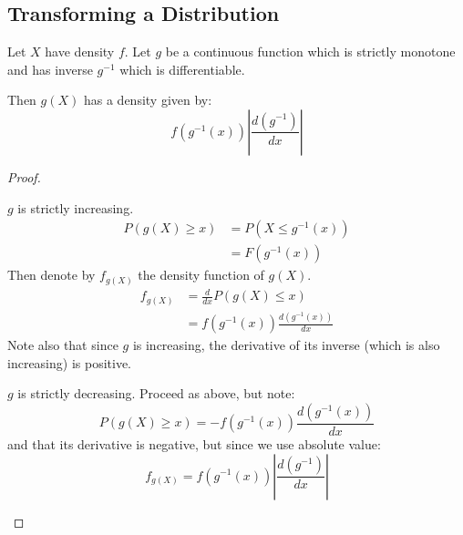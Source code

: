 \documentclass[../Main.tex]{subfiles}
\begin{document}
\subsection{Transforming a Distribution}
\begin{theorem}
    Let $X$ have density $f$. Let $g$ be a continuous function which is strictly monotone and has inverse $g^{-1}$ which is differentiable.\par
    Then $g(X)$ has a density given by:
    \begin{equation*}
        f(g^{-1}(x)) \left|\frac{d(g^{-1})}{dx}\right|
    \end{equation*}
\end{theorem}
\begin{proof}
    \begin{case}{$g$ is strictly increasing.}
        \begin{align*}
            P(g(X) \geq x) &= P(X \leq g^{-1}(x)) \\
            &= F(g^{-1}(x))
        \end{align*}
        Then denote by $f_{g(X)}$ the density function of $g(X)$.
        \begin{align*}
            f_{g(X)} &= \frac{d}{dx} P(g(X) \leq x) \\
            &= f(g^{-1}(x)) \frac{d(g^{-1}(x))}{dx}
        \end{align*}
        Note also that since $g$ is increasing, the derivative of its inverse (which is also increasing) is positive.
    \end{case}
    \begin{case}{$g$ is strictly decreasing.}
        Proceed as above, but note:
        \begin{equation*}
            P(g(X) \geq x) = -f(g^{-1}(x)) \frac{d(g^{-1}(x))}{dx}
        \end{equation*}
        and that its derivative is negative, but since we use absolute value:
        \begin{equation*}
            f_{g(X)} = f(g^{-1}(x)) \left|\frac{d(g^{-1})}{dx}\right|
        \end{equation*}
    \end{case}
\end{proof}
\end{document}
